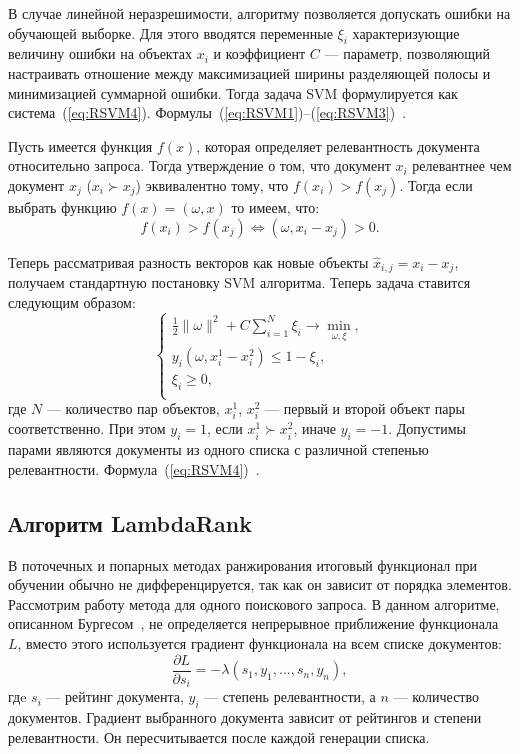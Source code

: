 В случае линейной неразрешимости, алгоритму позволяется допускать ошибки на обучающей выборке. Для этого вводятся переменные $\xi_{i}$ характеризующие величину ошибки на объектах $x_i$ и коэффициент $C$ --- параметр, позволяющий настраивать отношение между максимизацией ширины разделяющей полосы и минимизацией суммарной ошибки. Тогда задача SVM формулируется как система~(\ref{eq:RSVM4}). Формулы~(\ref{eq:RSVM1})--(\ref{eq:RSVM3})~\cite{ML_no_wors}.

Пусть имеется функция $f(x)$, которая определяет релевантность документа относительно запроса. Тогда утверждение о том, что документ $x_{i}$ релевантнее чем документ $x_{j}$  ($x_{i} \succ x_{j}$)  эквивалентно тому, что $f(x_{i}) > f(x_{j})$. Тогда если выбрать функцию $f(x)=(\omega, x)$ то имеем, что:
\[
	f(x_{i}) > f(x_{j}) \iff (\omega, x_{i} - x_{j}) > 0.
\]

Теперь рассматривая разность векторов как новые объекты $\hat{x}_{i, j} = x_{i} - x_{j}$, получаем стандартную постановку SVM алгоритма. Теперь задача ставится следующим образом:
\begin{equation}
\begin{cases}
	\label{eq:RSVM4}
	\frac{1}{2}\| \omega \|^2+C  \displaystyle\sum_{i=1}^{N} \xi_{i}\to \min_{\omega, \xi}, \\
	y_{i}(\omega, x_{i}^1 - x_{i}^2) \leq 1 - \xi_{i}, \\
	\xi_{i} \geq 0, \\
\end{cases}
\end{equation}
где $N$ --- количество пар объектов, $x_{i}^1$, $x_{i}^2$ --- первый и второй объект пары соответственно. При этом $y_{i} = 1$, если $x_{i}^1 \succ x_{i}^2$, иначе  $y_{i} = -1$. Допустимы парами являются документы из одного списка  с различной степенью релевантности. Формула~(\ref{eq:RSVM4})~\cite{RankSVM}.

\subsection{Алгоритм LambdaRank}

В поточечных и попарных методах ранжирования итоговый функционал при обучении обычно не дифференцируется, так как он зависит от порядка элементов. Рассмотрим работу метода для одного поискового запроса. В данном алгоритме, описанном Бургесом~\cite{LamdaRank}, не определяется непрерывное приближение функционала $L$, вместо этого используется градиент функционала на всем списке документов:
\begin{equation}
	\label{eq:LBR1}
	\frac{\partial L}{\partial s_{i}} = -\lambda(s_{1}, y_{1}, \dots, s_{n}, y_{n}),
\end{equation}
гдe $s_{i}$ --- рейтинг документа, $y_{i}$ --- степень релевантности, а $n$ --- количество документов. Градиент выбранного документа зависит от рейтингов и степени релевантности. Он пересчитывается после каждой генерации списка.

